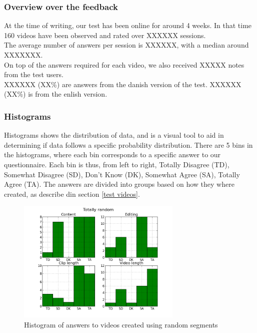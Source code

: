 \subsubsection{Overview over the feedback}
At the time of writing, our test has been online for around 4 weeks. In that time 160 videos have been observed and rated over XXXXXX sessions.\\
The average number of answers per session is XXXXXX, with a median around XXXXXXX.\\
On top of the answers required for each video, we also received XXXXX notes from the test users.\\
XXXXXX (XX\%) are answers from the danish version of the test. XXXXXX (XX\%) is from the enlish version.
%
\subsubsection{Histograms}\label{sec:histograms}
%
Histograms shows the distribution of data, and is a visual tool to aid in determining if data follows a specific probability distribution. There are 5 bins in the histograms, where each bin corresponds to a specific answer to our questionnaire. Each bin is thus, from left to right, Totally Disagree (TD), Somewhat Disagree (SD), Don't Know (DK), Somewhat Agree (SA), Totally Agree (TA). The answers are divided into groups based on how they where created, as describe din section \ref{test videos}.
%
\begin{figure}[!ht]
     \centering
     \includegraphics[width=0.7\textwidth]{img/totallyrandom_barplot.png}
     \caption{Histogram of answers to videos created using random segments}\label{fig:hist_random}
\end{figure}
%
